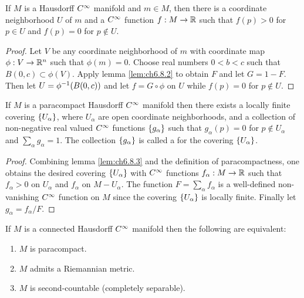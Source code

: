 \documentclass[../main]{subfiles}
\begin{document}
\begin{lemma} \label{lem:ch6.8.3}
If $M$ is a Hausdorff $C^\infty$ manifold and $m\in M$, then there is a coordinate neighborhood $U$ of $m$ and a $C^\infty$ function $f:M\to\mathbb{R}$ such that $f(p)>0$ for $p\in U$ and $f(p)=0$ for $p\notin U$.
\end{lemma}

\begin{proof}
Let $V$ be any coordinate neighborhood of $m$ with coordinate map \newline $\phi:V\to\mathbb{R}^n$ such that $\phi(m)=0$. Choose real numbers $0<b<c$ such that $B(0,c)\subset\phi(V)$. Apply lemma \ref{lem:ch6.8.2} to obtain $F$ and let $G=1-F$. Then let $U=\phi^{-1}(B(0,c))$ and let $f=G\circ\phi$ on $U$ while $f(p)=0$ for $p\notin U$.
\end{proof}



\begin{lemma} \label{lem:ch6.8.4}
If $M$ is a paracompact Hausdorff $C^\infty$ manifold then there exists a locally finite covering $\left\{U_\alpha\right\}$, where $U_\alpha$ are open coordinate neighborhoods, and a collection of non-negative real valued $C^\infty$ functions $\left\{g_\alpha\right\}$ such that $g_\alpha(p)=0$ for $p\notin U_\alpha$ and $\sum_\alpha g_\alpha=1$. The collection $\left\{g_\alpha\right\}$ is called a  for the covering $\left\{U_\alpha\right\}$.
\end{lemma}

\begin{proof}
Combining lemma \ref{lem:ch6.8.3} and the definition of paracompactness, one obtains the desired covering $\left\{U_\alpha\right\}$ with $C^\infty$ functions $f_\alpha:M\to\mathbb{R}$ such that $f_\alpha>0$ on $U_\alpha$ and $f_\alpha$ on $M-U_\alpha$. The function $F=\sum_\alpha f_\alpha$ is a well-defined non-vanishing $C^\infty$ function on $M$ since the covering $\left\{U_\alpha\right\}$ is locally finite. Finally let $g_\alpha=f_\alpha/F$.
\end{proof}



\begin{theorem} \label{thm:ch6.8.5}
If $M$ is a connected Hausdorff $C^\infty$ manifold then the following are equivalent:
\begin{enumerate}[label=(\alph*)]
    \item $M$ is paracompact.
    \item $M$ admits a Riemannian metric.
    \item $M$ is second-countable (completely separable).
\end{enumerate}
\end{theorem}
\end{document}
